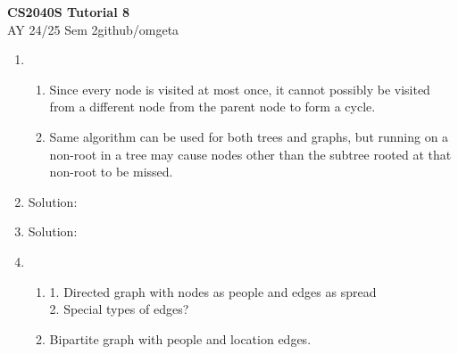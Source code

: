 \documentclass[12pt, a4paper]{article}
\newcommand{\mytitle}{CS2040S Tutorial 8}
\newcommand{\myauthor}{github/omgeta}
\newcommand{\mydate}{AY 24/25 Sem 2}
\begin{document}
\raggedright
\footnotesize
\begin{center}
{\normalsize{\textbf{\mytitle}}} \\
{\footnotesize{\mydate\hspace{2pt}\textemdash\hspace{2pt}\myauthor}}
\end{center}
\begin{enumerate}[Q\arabic*.]
  \item 
    \begin{enumerate}[(\alph*)]
      \item Since every node is visited at most once, it cannot possibly be visited from a different node from the parent node to form a cycle. 

      \item Same algorithm can be used for both trees and graphs, but running on a non-root in a tree may cause nodes other than the subtree rooted at that non-root to be missed.
    \end{enumerate}

  \item Solution:

  \item Solution:

  \item 
    \begin{enumerate}[(\alph*.)]
      \item 1. Directed graph with nodes as people and edges as spread\\
        2. Special types of edges?

      \item Bipartite graph with people and location edges.


\end{enumerate}
\end{enumerate}
\end{document}
